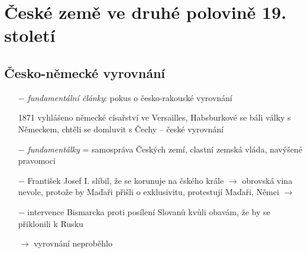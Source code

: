 \documentclass{article}
\begin{document}
\section*{České země ve druhé polovině 19. století}

\subsection*{Česko-německé vyrovnání}
\begin{itemize}
    \vspace{-0.5em}
    \setlength\itemsep{0.15em}
    \item[$-$] \textit{fundamentální články}: pokus o česko-rakouské vyrovnání
    \item[1871]  vyhlášeno německé císařství ve Versailles, Habsburkové se báli války s Německem, chtěli se domluvit s Čechy -- české vyrovnání
    \item[$-$] \textit{fundamentálky}  = samospráva Českých zemí, clastní zemská vláda, navýšené pravomoci
    \item[$-$] František Josef I. slíbil, že se korunuje na čského krále $\rightarrow$ obrovská vina nevole, protože by Maďaři přišli o exklusivitu, protestují Maďaři, Němci $\rightarrow$
    \item[$-$] intervence Bismarcka proti posílení Slovanů kvůli obavám, že by se přiklonili k Rusku
    \item[$\rightarrow$] vyrovnání neproběhlo
\end{itemize}
\end{document}
